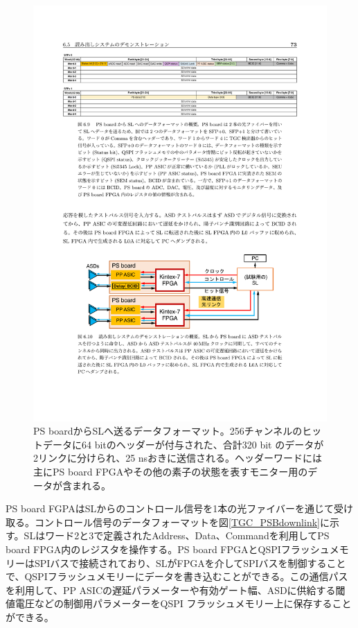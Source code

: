     \begin{figure} 
    \centering
    \includegraphics[width=16cm]{fig/Intro/TGC_PSBuplink.pdf}
    \caption[PS boardからSLへ送るデータフォーマット]{PS boardからSLへ送るデータフォーマット\cite{mt_aoki}。256チャンネルのヒットデータに64 bitのヘッダーが付与された、合計320 bit のデータが2リンクに分けられ、25 nsおきに送信される。ヘッダーワードには主にPS board FPGAやその他の素子の状態を表すモニター用のデータが含まれる。}
    \label{TGC_PSBuplink}
    \end{figure}

    PS board FGPAはSLからのコントロール信号を1本の光ファイバーを通じて受け取る。コントロール信号のデータフォーマットを図\ref{TGC_PSBdownlink}に示す。SLはワード2と3で定義されたAddress、Data、Commandを利用してPS board FPGA内のレジスタを操作する。PS board FPGAとQSPIフラッシュメモリーはSPIバスで接続されており、SLがFPGAを介してSPIバスを制御することで、QSPIフラッシュメモリーにデータを書き込むことができる。この通信パスを利用して、PP ASICの遅延パラメーターや有効ゲート幅、ASDに供給する閾値電圧などの制御用パラメーターをQSPI フラッシュメモリー上に保存することができる。

